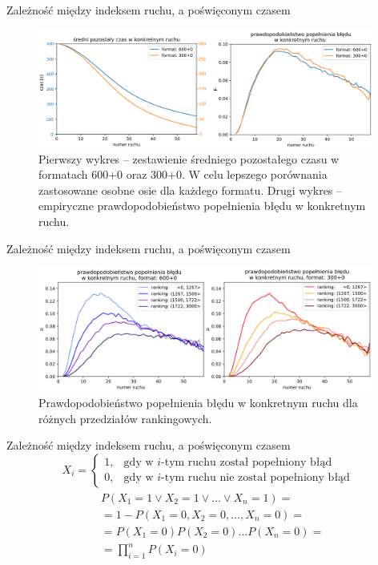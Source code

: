 \documentclass{beamer}
\begin{document}
\begin{frame}{Zależność między indeksem ruchu, a poświęconym czasem}
	\begin{figure}[H]
		\centering
		\includegraphics[width=11cm]{../Formatka/pozostaly_czas.png}
		\caption{
			Pierwszy wykres -- zestawienie średniego pozostałego czasu w formatach 600+0 oraz 300+0. W celu lepszego porównania zastosowane osobne osie dla każdego formatu. Drugi wykres -- empiryczne prawdopodobieństwo popełnienia błędu w konkretnym ruchu.}
		\label{rys:pozostaly_czas}
	\end{figure}
\end{frame}

\begin{frame}{Zależność między indeksem ruchu, a poświęconym czasem}
\begin{figure}[H]
	\centering
	\includegraphics[width=11cm]{../Formatka/prawd_blad_ELO.png}
	\caption{Prawdopodobieństwo popełnienia błędu w konkretnym ruchu dla różnych przedziałów rankingowych.}
	\label{rys:prawd_blad_ELO}
\end{figure}
\end{frame}

\begin{frame}{Zależność między indeksem ruchu, a poświęconym czasem}
	\begin{equation*}
		X_i =
		\begin{cases}
			1, & \text{gdy w $i$-tym ruchu został popełniony błąd}\\
			0, & \text{gdy w $i$-tym ruchu nie został popełniony błąd}
		\end{cases}       
	\end{equation*}
\begin{multline*}
	\begin{split}
		& P(X_1 = 1 \vee X_2 = 1 \vee \dots \vee X_n = 1) =\\
		& = 1 - P(X_1 = 0, X_2 = 0,\dots, X_n = 0) = \\
		& = P(X_1 = 0)P(X_2 = 0)\dots P(X_n = 0) = \\
		& = \prod_{i=1}^{n}P(X_i=0)
	\end{split}
\end{multline*}
\end{frame}
\end{document}
